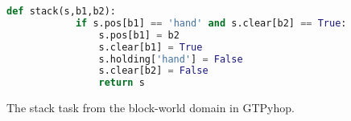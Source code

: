\begin{Listing}
    \begin{lstlisting}[language=Python]
        def stack(s,b1,b2):
            if s.pos[b1] == 'hand' and s.clear[b2] == True:
                s.pos[b1] = b2
                s.clear[b1] = True
                s.holding['hand'] = False
                s.clear[b2] = False
                return s
    \end{lstlisting}
    \caption{The stack task from the block-world domain in GTPyhop.}
    \label{lst:StackPython}
\end{Listing}